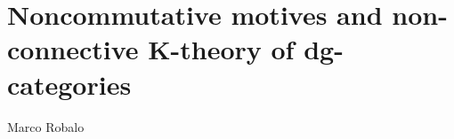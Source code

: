 \chapter{Noncommutative motives and non-connective K-theory of dg-categories}
\begin{flushright}
  Marco Robalo
\end{flushright}

\begin{refsection}

\end{refsection}
